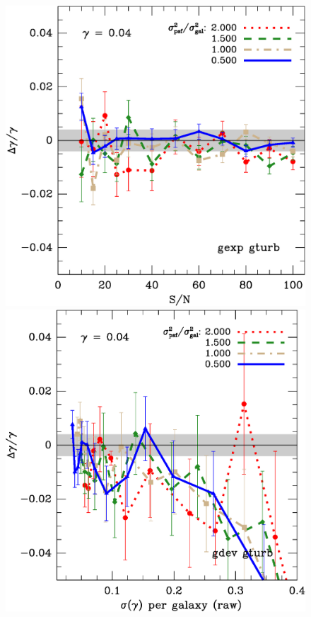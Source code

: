 \documentclass[12pt]{article}
\begin{document}
\begin{figure}[t]
\centering

\includegraphics[scale=0.4]{mcbayes-get01r05r06r07r08-yr-0.050-0.050-frac.eps}
\includegraphics[scale=0.4]{mcbayes-gdt02r11r12r13-yr-0.050-0.050-efrac.eps}


\end{figure}
\end{document}
